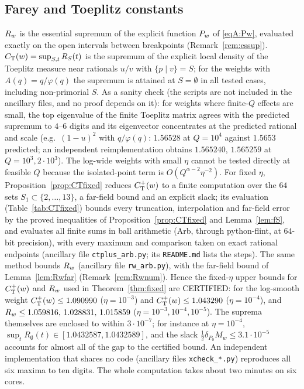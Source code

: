\documentclass[11pt]{amsart}
\theoremstyle{definition}
\theoremstyle{remark}
\numberwithin{equation}{section}
\begin{document}
\subsection{Farey and Toeplitz constants}
$R_w$ is the essential supremum of the explicit function $P_w$ of \eqref{eqA:Pw}, evaluated exactly on the open intervals between breakpoints (Remark~\ref{rem:essup}). $C_{\mathrm T}(w)=\sup_{S,t}R_S(t)$ is the supremum of the explicit local density of the Toeplitz measure near rationals $u/v$ with $\{p\mid v\}=S$; for the weights with $A(q)=q/\varphi(q)$ the supremum is attained at $S=\emptyset$ in all tested cases, including non-primorial $S$. As a sanity check (the scripts are not included in the ancillary files, and no proof depends on it): for weights where finite-$Q$ effects are small, the top eigenvalue of the finite Toeplitz matrix agrees with the predicted supremum to $4$--$6$ digits and its eigenvector concentrates at the predicted rational and scale (e.g.\ $(1-u)^2$ with $q/\varphi(q)$: $1.56528$ at $Q=10^4$ against $1.5653$ predicted; an independent reimplementation obtains $1.565240$, $1.565259$ at $Q=10^3,2\cdot10^3$). The log-wide weights with small $\eta$ cannot be tested directly at feasible $Q$ because the isolated-point term is $O(Q^{\alpha-2}\eta^{-2})$. For fixed $\eta$, Proposition~\ref{prop:CTfixed} reduces $C^{+}_{\mathrm T}(w)$ to a finite computation over the $64$ sets $S_1\subset\{2,\dots,13\}$, a far-field bound and an explicit slack; its evaluation (Table~\ref{tab:CTfixed}) bounds every truncation, interpolation and far-field error by the proved inequalities of Proposition~\ref{prop:CTfixed} and Lemma~\ref{lem:fS}, and evaluates all finite sums in ball arithmetic (Arb, through python-flint, at $64$-bit precision), with every maximum and comparison taken on exact rational endpoints (ancillary file \texttt{ctplus\_arb.py}; its \texttt{README.md} lists the steps). The same method bounds $R_w$ (ancillary file \texttt{rw\_arb.py}), with the far-field bound of Lemma~\ref{lem:Rwfar} (Remark~\ref{rem:Rwnum}). Hence the fixed-$\eta$ upper bounds for $C^{+}_{\mathrm T}(w)$ and $R_w$ used in Theorem~\ref{thm:fixed} are CERTIFIED: for the log-smooth weight $C^{+}_{\mathrm T}(w)\le1.090990$ ($\eta=10^{-3}$) and $C^{+}_{\mathrm T}(w)\le1.043290$ ($\eta=10^{-4}$), and $R_w\le1.059816,\,1.028831,\,1.015859$ ($\eta=10^{-3},10^{-4},10^{-5}$). The suprema themselves are enclosed to within $3\cdot10^{-7}$; for instance at $\eta=10^{-4}$, $\sup_tR_\emptyset(t)\in[1.0432587,1.0432589]$, and the slack $\frac12\delta_{P_0}M_w\le3.1\cdot10^{-5}$ accounts for almost all of the gap to the certified bound. An independent implementation that shares no code (ancillary files \texttt{xcheck\_*.py}) reproduces all six maxima to ten digits. The whole computation takes about two minutes on six cores.
\end{document}
